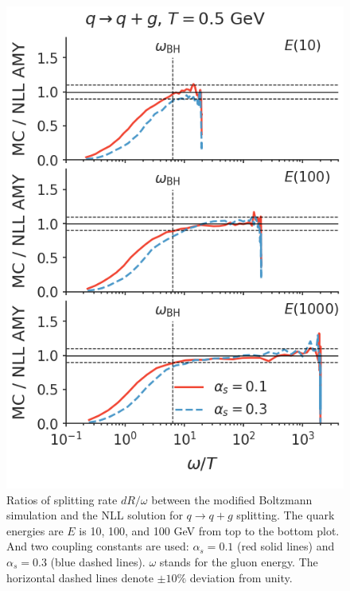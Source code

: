 \documentclass[aps, prc, reprint, amsmath, groupedaddress, nofootinbib]{revtex4-1}
\begin{document}
\begin{appendices}
\begin{figure}[t]
\includegraphics[width=\columnwidth]{spectrum_E_q2qg.png}
\caption{Ratios of splitting rate $dR/\omega$ between the modified Boltzmann simulation and the NLL solution for $q\rightarrow q+g$ splitting. The quark energies are $E$ is 10, 100, and 100 GeV from top to the bottom plot. 
And two coupling constants are used: $\alpha_s = 0.1$ (red solid lines) and $\alpha_s = 0.3$ (blue dashed lines).
$\omega$ stands for the gluon energy.
The horizontal dashed lines denote $\pm 10\%$ deviation from unity. }
\label{fig:q2qg}
\end{figure}


\end{appendices}
\end{document}
